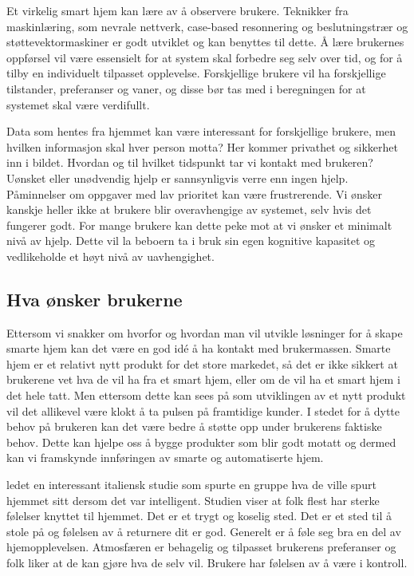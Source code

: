 Et virkelig smart hjem kan lære av å observere brukere. Teknikker fra maskinlæring, som nevrale nettverk, case-based resonnering og beslutningstrær og støttevektormaskiner er godt utviklet og kan benyttes til dette. Å lære brukernes oppførsel vil være essensielt for at system skal forbedre seg selv over tid, og for å tilby en individuelt tilpasset opplevelse. Forskjellige brukere vil ha forskjellige tilstander, preferanser og vaner, og disse bør tas med i beregningen for at systemet skal være verdifullt.

Data som hentes fra hjemmet kan være interessant for forskjellige brukere, men hvilken informasjon skal hver person motta? Her kommer privathet og sikkerhet inn i bildet. Hvordan og til hvilket tidspunkt tar vi kontakt med brukeren? Uønsket eller unødvendig hjelp er sannsynligvis verre enn ingen hjelp. Påminnelser om oppgaver med lav prioritet kan være frustrerende. Vi ønsker kanskje heller ikke at brukere blir overavhengige av systemet, selv hvis det fungerer godt. For mange brukere kan dette peke mot at vi ønsker et minimalt nivå av hjelp. Dette vil la beboern ta i bruk sin egen kognitive kapasitet og vedlikeholde et høyt nivå av uavhengighet. 

\subsection*{Hva ønsker brukerne}
Ettersom vi snakker om hvorfor og hvordan man vil utvikle løsninger for å skape smarte hjem kan det være en god idé å ha kontakt med brukermassen. Smarte hjem er et relativt nytt produkt for det store markedet, så det er ikke sikkert at brukerene vet hva de vil ha fra et smart hjem, eller om de vil ha et smart hjem i det hele tatt. Men ettersom dette kan sees på som utviklingen av et nytt produkt vil det allikevel være klokt å ta pulsen på framtidige kunder. I stedet for å dytte behov på brukeren kan det være bedre å støtte opp under brukerens faktiske behov. Dette kan hjelpe oss å bygge produkter som blir godt motatt og dermed kan vi framskynde innføringen av smarte og automatiserte hjem.

\citet{bonino11} ledet en interessant italiensk studie som spurte en gruppe hva de ville spurt hjemmet sitt dersom det var intelligent. Studien viser at folk flest har sterke følelser knyttet til hjemmet. Det er et trygt og koselig sted. Det er et sted til å stole på og følelsen av å returnere dit er god. Generelt er å føle seg bra en del av hjemopplevelsen. Atmosfæren er behagelig og tilpasset brukerens preferanser og folk liker at de kan gjøre hva de selv vil. Brukere har følelsen av å være i kontroll.

